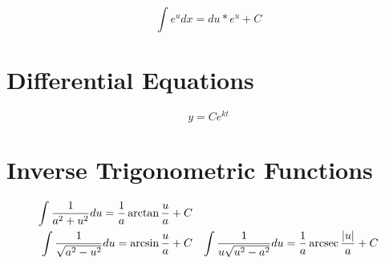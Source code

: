 \begin{equation}
  \int e^u dx = du * e^u + C
\end{equation}

\section{Differential Equations}
\begin{equation}
  y=Ce^{kt}
\end{equation}

\section{Inverse Trigonometric Functions}
\begin{align}
  \int \frac{1}{a^2+u^2} du = \frac{1}{a}\arctan{\frac{u}{a}} + C \\
  \int \frac{1}{\sqrt{a^2-u^2}} du = \arcsin{\frac{u}{a}} + C &&
  \int \frac{1}{u\sqrt{u^2-a^2}} du = \frac{1}{a}\operatorname{arcsec}{\frac{|u|}{a}} + C
\end{align}
